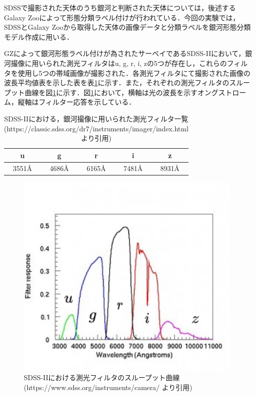 \documentclass[a4j, 11pt]{jreport}
\begin{document}
SDSSで撮影された天体のうち銀河と判断された天体については，後述するGalaxy Zooによって形態分類ラベル付けが行われている．今回の実験では，SDSSとGalaxy Zooから取得した天体の画像データと分類ラベルを銀河形態分類モデル作成に用いる．

GZによって銀河形態ラベル付けが為されたサーベイであるSDSS-IIにおいて，銀河撮像に用いられた測光フィルタはu, g, r, i, zの5つが存在し，これらのフィルタを使用し5つの帯域画像が撮影された．各測光フィルタにて撮影された画像の波長平均値表を示した表を表\ref{fig:dr7_filters}に示す．また，それぞれの測光フィルタのスループット曲線を図\ref{fig:filter_responces}に示す．図\ref{fig:filter_responces}において，横軸は光の波長を示すオングストローム，縦軸はフィルター応答を示している．

\begin{table}[htbp]
  \centering
	\caption{SDSS-IIにおける，銀河撮像に用いられた測光フィルタ一覧\\(https://classic.sdss.org/dr7/instruments/imager/index.html より引用)}
  \begin{tabular}{|c|c|c|c|c|}
		\hline
    u & g & r & i & z \\ \hline
    3551Å & 4686Å & 6165Å & 7481Å & 8931Å \\ \hline
  \end{tabular}
  \label{fig:dr7_filters}
\end{table}


\begin{figure}[H]
 \centering
 \includegraphics[width=11cm]{images/drawio/filter_responces.png}
 \caption{SDSS-IIにおける測光フィルタのスループット曲線\\(https://www.sdss.org/instruments/camera/ より引用)}
 \label{fig:filter_responces}
\end{figure}
\end{document}
